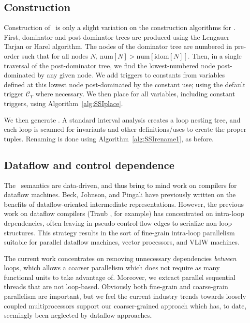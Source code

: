 \documentclass[12pt,titlepage,twoside]{article}
\begin{document}
\subsection{Construction}
Construction of \ssiplus\ is only a slight variation on the
construction algorithms for \ssizero.  First, dominator and
post-dominator trees are produced using the Lengauer-Tarjan
\cite{lengauer79} or Harel \cite{harel85} algorithm.  The nodes of the
dominator tree are numbered in pre-order such that for all nodes $N$,
$\text{num}[N]>\text{num}[\text{idom}[N]]$.
Then, in a single traversal of the post-dominator tree, we find the
lowest-numbered node post-dominated by any given node.  We add
triggers to constants from variables defined at this lowest node
post-dominated by the constant use; using the default trigger
$\mathcal{C}_T$ where necessary.  We then place 
for all variables, including constant triggers, using
Algorithm~\ref{alg:SSIplace}.

We then generate .  A standard interval analysis
creates a loop nesting tree, and each loop is scanned for invariants
and other definitions/uses to create the proper \xifunction{} tuples.
Renaming is done using Algorithm~\ref{alg:SSIrename1}, as before.

\subsection{Dataflow and control dependence}\label{sec:parallelism}
The \ssiplus\ semantics are data-driven, and thus bring to mind work
on compilers for dataflow machines.  Beck, Johnson, and Pingali have
previously written \cite{beck91:ctrlflow} on the benefits of
dataflow-oriented intermediate representations.  However, the previous
work on dataflow compilers (Traub \cite{traub86:ttda}, for example)
has concentrated on intra-loop dependencies, often leaving in
pseudo-control-flow edges to serialize non-loop structures.  This
strategy results in the sort of fine-grain intra-loop parallelism
suitable for parallel dataflow machines, vector processors, and VLIW
machines.

The current work concentrates on removing unnecessary dependencies
\emph{between} loops, which allows a coarser parallelism which does
not require as many functional units to take advantage of.  Moreover,
we extract parallel sequential threads that are not loop-based.
Obviously both fine-grain and coarse-grain parallelism are important,
but we feel the current industry trends towards loosely coupled
multiprocessors support our coarser-grained approach which has, to
date, seemingly been neglected by dataflow approaches.
\end{document}
